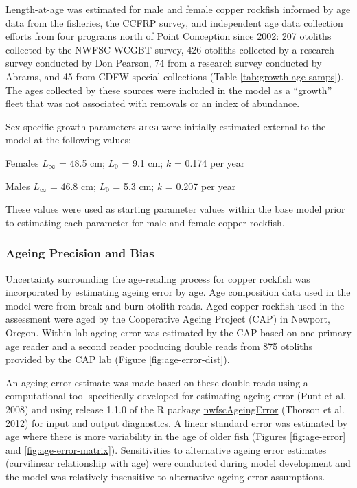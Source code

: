 \documentclass[11pt,
  english,
  letterpaper,
]{article}
\begin{document}
Length-at-age was estimated for male and female copper rockfish informed by age data from the fisheries, the CCFRP survey, and independent age data collection efforts from four programs north of Point Conception since 2002: 207 otoliths collected by the NWFSC WCGBT survey, 426 otoliths collected by a research survey conducted by Don Pearson, 74 from a research survey conducted by Abrams, and 45 from CDFW special collections (Table \ref{tab:growth-age-samps}). The ages collected by these sources were included in the model as a ``growth'' fleet that was not associated with removals or an index of abundance.

Sex-specific growth parameters \texttt{area} were initially estimated external to the model at the following values:

\begin{centering}

Females $L_{\infty}$ = 48.5 cm; $L_0$ = 9.1 cm; $k$ = 0.174 per year

Males $L_{\infty}$ = 46.8 cm; $L_0$ = 5.3 cm; $k$ = 0.207 per year

\end{centering}

\vspace{0.50cm}

These values were used as starting parameter values within the base model prior to estimating each parameter for male and female copper rockfish.

\hypertarget{ageing-precision-and-bias}{%
\subsubsection{Ageing Precision and Bias}\label{ageing-precision-and-bias}}

Uncertainty surrounding the age-reading process for copper rockfish was incorporated by estimating ageing error by age. Age composition data used in the model were from break-and-burn otolith reads. Aged copper rockfish used in the assessment were aged by the Cooperative Ageing Project (CAP) in Newport, Oregon. Within-lab ageing error was estimated by the CAP based on one primary age reader and a second reader producing double reads from 875 otoliths provided by the CAP lab (Figure \ref{fig:age-error-dist}).

An ageing error estimate was made based on these double reads using a computational tool specifically developed for estimating ageing error (Punt et al. 2008) and using release 1.1.0 of the R package \href{https://github.com/nwfsc-assess/nwfscAgeingError}{nwfscAgeingError} (Thorson et al. 2012) for input and output diagnostics. A linear standard error was estimated by age where there is more variability in the age of older fish (Figures \ref{fig:age-error} and \ref{fig:age-error-matrix}). Sensitivities to alternative ageing error estimates (curvilinear relationship with age) were conducted during model development and the model was relatively insensitive to alternative ageing error assumptions.
\end{document}

